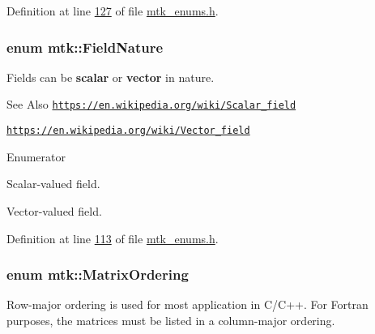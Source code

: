 Definition at line \hyperlink{mtk__enums_8h_source_l00127}{127} of file \hyperlink{mtk__enums_8h_source}{mtk\-\_\-enums.\-h}.

\hypertarget{group__c02-enums_ga4c54f2a329cfb4e56213b02a259d19e2}{
\subsubsection[{Field\-Nature}]{\setlength{\rightskip}{0pt plus 5cm}enum {\bf mtk\-::\-Field\-Nature}}}\label{group__c02-enums_ga4c54f2a329cfb4e56213b02a259d19e2}
Fields can be {\bfseries scalar} or {\bfseries vector} in nature.

\begin{DoxySeeAlso}{See Also}
\href{https://en.wikipedia.org/wiki/Scalar_field}{\tt https\-://en.\-wikipedia.\-org/wiki/\-Scalar\-\_\-field}

\href{https://en.wikipedia.org/wiki/Vector_field}{\tt https\-://en.\-wikipedia.\-org/wiki/\-Vector\-\_\-field} 
\end{DoxySeeAlso}
\begin{Desc}
\item[Enumerator]\par
\begin{description}
\item[{\em 
\hypertarget{group__c02-enums_ga4c54f2a329cfb4e56213b02a259d19e2af481d45bd70d41381c7d72e200889205}{S\-C\-A\-L\-A\-R}\label{group__c02-enums_ga4c54f2a329cfb4e56213b02a259d19e2af481d45bd70d41381c7d72e200889205}
}]Scalar-\/valued field. \item[{\em 
\hypertarget{group__c02-enums_ga4c54f2a329cfb4e56213b02a259d19e2a3d8cb27a993651a74d67fb8c98ae91b2}{V\-E\-C\-T\-O\-R}\label{group__c02-enums_ga4c54f2a329cfb4e56213b02a259d19e2a3d8cb27a993651a74d67fb8c98ae91b2}
}]Vector-\/valued field. \end{description}
\end{Desc}


Definition at line \hyperlink{mtk__enums_8h_source_l00113}{113} of file \hyperlink{mtk__enums_8h_source}{mtk\-\_\-enums.\-h}.

\hypertarget{group__c02-enums_ga622801bd9f912d0f976c3e383f5f581c}{
\subsubsection[{Matrix\-Ordering}]{\setlength{\rightskip}{0pt plus 5cm}enum {\bf mtk\-::\-Matrix\-Ordering}}}\label{group__c02-enums_ga622801bd9f912d0f976c3e383f5f581c}
Row-\/major ordering is used for most application in C/\-C++. For Fortran purposes, the matrices must be listed in a column-\/major ordering.


